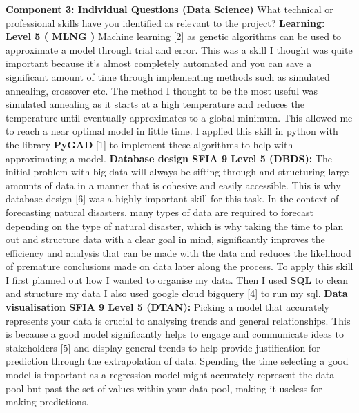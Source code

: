 \documentclass[../main.tex]{subfiles}
\begin{document}
\textbf{Component 3: Individual Questions (Data Science)}
\newline 
What technical or professional skills have you identified as relevant to the project?
\newline
\newline
\textbf{Learning: Level 5 ( MLNG )}
Machine learning [2] as genetic algorithms can be used to approximate a model through trial and error. This was a skill I thought was quite important because it's almost completely automated and you can save a significant amount of time through implementing methods such as simulated annealing, crossover etc. The method I thought to be the most useful was simulated annealing as it starts at a high temperature and reduces the temperature until eventually approximates to a global minimum. This allowed me to reach a near optimal model in little time.
\newline
\newline
 I applied this skill in python with the library \textbf{PyGAD} [1] to implement these algorithms to help with approximating a model. \newline
\newline
\textbf{Database design SFIA 9 Level 5 (DBDS):}
The initial problem with big data will always be sifting through and structuring large amounts of data in a manner that is cohesive and easily accessible. This is why database design [6] was a highly important skill for this task. In the context of forecasting natural disasters, many types of data are required to forecast depending on the type of natural disaster, which is why taking the time to plan out and structure data with a clear goal in mind, significantly improves the efficiency and analysis that can be made with the data and reduces the likelihood of premature conclusions made on data later along the process.
\newline
\newline
To apply this skill I first planned out how I wanted to organise my data. Then I used \textbf{SQL} to clean and structure my data I also used google cloud bigquery [4] to run my sql.
\newline
\newline
\textbf{Data visualisation SFIA 9 Level 5 (DTAN):}
Picking a model that accurately represents your data is crucial to analysing trends and general relationships. This is because a good model significantly helps to engage and communicate ideas to stakeholders [5] and display general trends to help provide justification for prediction through the extrapolation of data. Spending the time selecting a good model is important as a regression model might accurately represent the data pool but past the set of values within your data pool, making it useless for making predictions. 
\end{document}
